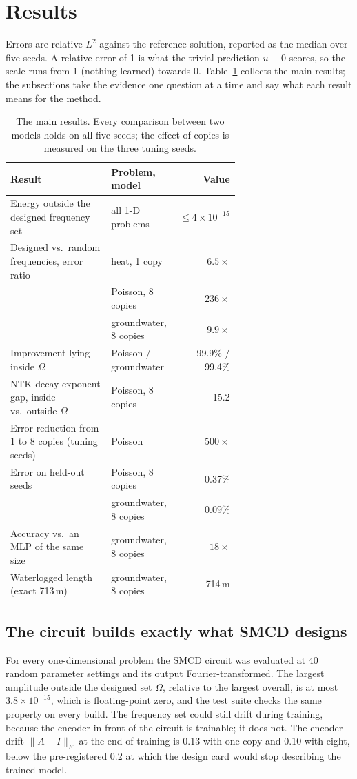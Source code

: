 \section{Results}
\label{sec:results}

Errors are relative $L^2$ against the reference solution, reported as the median over
five seeds. A relative error of 1 is what the trivial prediction $u\equiv0$ scores, so
the scale runs from 1 (nothing learned) towards 0. Table~\ref{tab:glance} collects the
main results; the subsections take the evidence one question at a time and say what each
result means for the method.

\begin{table}[htbp]
  \centering
  \small
  \begin{tabular}{p{0.44\linewidth}p{0.22\linewidth}r}
  \toprule
  Result & Problem, model & Value \\
  \midrule
  Energy outside the designed frequency set & all 1-D problems & $\le4\times10^{-15}$ \\
  Designed vs.\ random frequencies, error ratio & heat, 1 copy & $6.5\times$ \\
  & Poisson, 8 copies & $236\times$ \\
  & groundwater, 8 copies & $9.9\times$ \\
  Improvement lying inside $\Omega$ & Poisson / groundwater & 99.9\% / 99.4\% \\
  NTK decay-exponent gap, inside vs.\ outside $\Omega$ & Poisson, 8 copies & 15.2 \\
  Error reduction from 1 to 8 copies (tuning seeds) & Poisson & $500\times$ \\
  Error on held-out seeds & Poisson, 8 copies & 0.37\% \\
  & groundwater, 8 copies & 0.09\% \\
  Accuracy vs.\ an MLP of the same size & groundwater, 8 copies & $18\times$ \\
  Waterlogged length (exact 713\,m) & groundwater, 8 copies & 714\,m \\
  \bottomrule
  \end{tabular}
  \caption{The main results. Every comparison between two models holds on all five
    seeds; the effect of copies is measured on the three tuning seeds.}
  \label{tab:glance}
\end{table}

\subsection{The circuit builds exactly what SMCD designs}
\label{sec:realise}
For every one-dimensional problem the SMCD circuit was evaluated at 40 random parameter
settings and its output Fourier-transformed. The largest amplitude outside the designed
set $\Omega$, relative to the largest overall, is at most $3.8\times10^{-15}$, which is
floating-point zero, and the test suite checks the same property on every build. The
frequency set could still drift during training, because the encoder in front of the
circuit is trainable; it does not. The encoder drift $\|A-I\|_F$ at the end of training
is 0.13 with one copy and 0.10 with eight, below the pre-registered 0.2 at which the
design card would stop describing the trained model.

